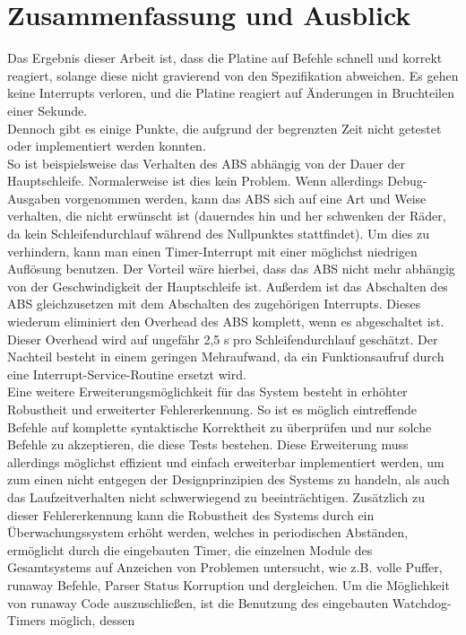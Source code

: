 \chapter{Zusammenfassung und Ausblick}
Das Ergebnis dieser Arbeit ist, dass die Platine auf Befehle schnell und korrekt reagiert,
solange diese nicht gravierend von den Spezifikation abweichen. Es gehen keine Interrupts verloren, und die
Platine reagiert auf Änderungen in Bruchteilen einer Sekunde.\\
Dennoch gibt es einige Punkte, die aufgrund der begrenzten Zeit nicht getestet oder implementiert
werden konnten.\\
So ist beispielsweise das Verhalten des ABS abhängig von der Dauer der Hauptschleife. Normalerweise
ist dies kein Problem. Wenn allerdings Debug-Ausgaben vorgenommen werden, kann das ABS sich
auf eine Art und Weise verhalten, die nicht erwünscht ist (dauerndes hin und her schwenken der Räder,
da kein Schleifendurchlauf während des Nullpunktes stattfindet). Um dies zu verhindern, kann man
einen Timer-Interrupt mit einer möglichst niedrigen Auflösung benutzen. Der Vorteil wäre hierbei,
dass das ABS nicht mehr abhängig von der Geschwindigkeit der Hauptschleife ist. Außerdem ist das
Abschalten des ABS gleichzusetzen mit dem Abschalten des zugehörigen Interrupts. Dieses wiederum
eliminiert den Overhead des ABS komplett, wenn es abgeschaltet ist. Dieser Overhead wird auf
ungefähr 2,5 \textmu{}s pro Schleifendurchlauf geschätzt. Der Nachteil besteht in einem geringen
Mehraufwand, da ein Funktionsaufruf durch eine Interrupt-Service-Routine ersetzt wird.\\
Eine weitere Erweiterungsmöglichkeit für das System besteht in erhöhter Robustheit und erweiterter
Fehlererkennung. So ist es möglich eintreffende Befehle auf komplette syntaktische Korrektheit
zu überprüfen und nur solche Befehle zu akzeptieren, die diese Tests bestehen. Diese Erweiterung
muss allerdings möglichst effizient und einfach erweiterbar implementiert werden, um zum einen nicht
entgegen der Designprinzipien des Systems zu handeln, als auch das Laufzeitverhalten nicht
schwerwiegend zu beeinträchtigen. Zusätzlich zu dieser Fehlererkennung kann die Robustheit des Systems
durch ein Überwachungssystem erhöht werden, welches in periodischen Abständen, ermöglicht durch
die eingebauten Timer, die einzelnen Module des Gesamtsystems auf Anzeichen von Problemen untersucht,
wie z.B. volle Puffer, runaway Befehle, Parser Status Korruption und dergleichen. Um die Möglichkeit
von runaway Code auszuschließen, ist die Benutzung des eingebauten Watchdog-Timers möglich, dessen
